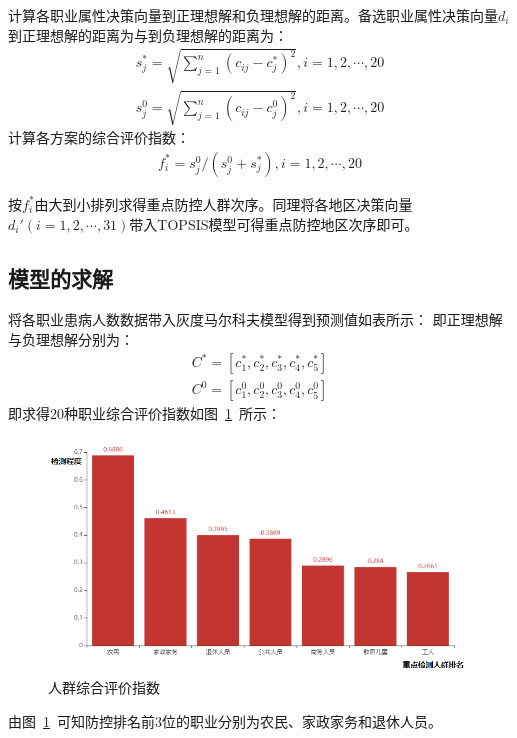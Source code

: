 \documentclass{whutmod}
\begin{document}
    计算各职业属性决策向量到正理想解和负理想解的距离。备选职业属性决策向量$d_{i}$到正理想解的距离为与到负理想解的距离为：
    \begin{gather*}
    s_{j}^{*}=\sqrt{\sum_{j=1}^{n}(c_{ij}-c_{j}^*)^{2}},i=1,2,\cdots,20\\
    s_{j}^{0}=\sqrt{\sum_{j=1}^{n}(c_{ij}-c_{j}^{0})^{2}},i=1,2,\cdots,20
    \end{gather*}
    计算各方案的综合评价指数：
    \begin{gather}
    f_{i}^{*}=s_{j}^{0}/(s_{j}^{0}+s_{j}^{*}),i=1,2,\cdots,20
    \end{gather}

    按$f_{i}^{*}$由大到小排列求得重点防控人群次序。同理将各地区决策向量$d_{i}'(i=1,2,\cdots,31)$带入TOPSIS模型可得重点防控地区次序即可。

    \subsection{模型的求解}

    将各职业患病人数数据带入灰度马尔科夫模型得到预测值如表所示：
    即正理想解与负理想解分别为：
    \begin{gather}
    C^{*}=[c_{1}^{*},c_{2}^{*},c_{3}^{*},c_{4}^{*},c_{5}^{*}]\\
    C^{0}=[c_{1}^{0},c_{2}^{0},c_{3}^{0},c_{4}^{0},c_{5}^{0}]
    \end{gather}
    即求得$20$种职业综合评价指数如图~\ref{oc}~所示：
    \begin{figure}[H]
    	\centering
    	\includegraphics[width=\textwidth]{figures/oc.png}
    	\caption{人群综合评价指数}\label{oc}
    \end{figure}
	

    由图~\ref{oc}~可知防控排名前$3$位的职业分别为农民、家政家务和退休人员。
    
\end{document}
